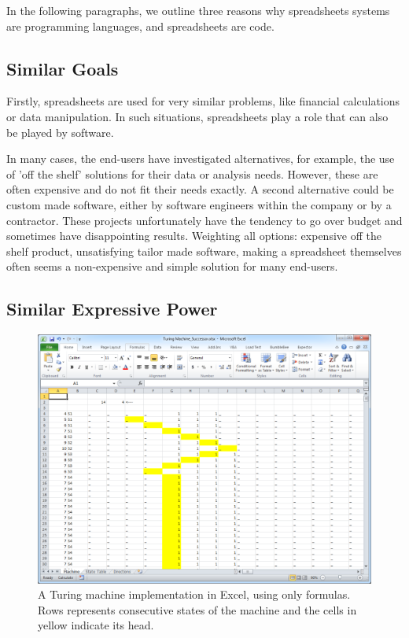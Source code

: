 \documentclass[conference]{IEEEtran}
\begin{document}
In the following paragraphs, we outline three reasons why spreadsheets systems are programming languages, and spreadsheets are code.

\subsection{Similar Goals}
Firstly, spreadsheets are used for very similar problems, like financial calculations or data manipulation. In such situations, spreadsheets play a role that can also be played by software. 

In many cases, the end-users have investigated alternatives, for example, the use of 'off the shelf' solutions for their data or analysis needs. However, these are often expensive and do not fit their needs exactly. A second alternative could be custom made software, either by software engineers within the company or by a contractor. These projects unfortunately have the tendency to go over budget and sometimes have disappointing results. Weighting all options: expensive off the shelf product, unsatisfying tailor made software, making a spreadsheet themselves often seems a non-expensive and simple solution for many end-users.

\subsection{Similar Expressive Power}

\begin{figure}
  \begin{center}
  \includegraphics[width=\columnwidth]{fig/turing.png}
  \caption{A Turing machine implementation in Excel, using only formulas. Rows represents consecutive states of the machine and the cells in yellow indicate its head.}
  \label{fig:visical}
  \end{center}
\end{figure} 
\end{document}
